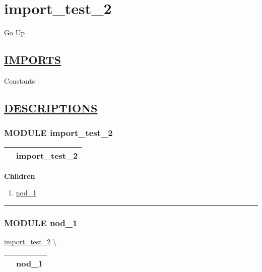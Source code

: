 \chapter*{\color{headfile}
import_test_2
}
\hypertarget{ecldoc:toc:import_test_2}{}
\hyperlink{ecldoc:toc:root}{Go Up}

\section*{\underline{\textsf{IMPORTS}}}
\begin{doublespace}
{\large
Constants |
}
\end{doublespace}

\section*{\underline{\textsf{DESCRIPTIONS}}}
\subsection*{\textsf{\colorbox{headtoc}{\color{white} MODULE}
import\_test\_2}}

\hypertarget{ecldoc:import_test_2}{}

{\renewcommand{\arraystretch}{1.5}
\begin{tabularx}{\textwidth}{|>{\raggedright\arraybackslash}l|X|}
\hline
\hspace{0pt}\mytexttt{\color{red} } & \textbf{import\_test\_2} \\
\hline
\end{tabularx}
}

\par


\textbf{Children}
\begin{enumerate}
\item \hyperlink{ecldoc:Constants}{nod\_1}
\end{enumerate}

\rule{\linewidth}{0.5pt}

\subsection*{\textsf{\colorbox{headtoc}{\color{white} MODULE}
nod\_1}}

\hypertarget{ecldoc:Constants}{}
\hspace{0pt} \hyperlink{ecldoc:import_test_2}{import_test_2} \textbackslash 

{\renewcommand{\arraystretch}{1.5}
\begin{tabularx}{\textwidth}{|>{\raggedright\arraybackslash}l|X|}
\hline
\hspace{0pt}\mytexttt{\color{red} } & \textbf{nod\_1} \\
\hline
\end{tabularx}
}

